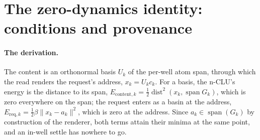 \documentclass{article} %
\begin{document}
\section{The zero-dynamics identity: conditions and provenance}
\label{app:clue}

\paragraph{The derivation.} The content is an orthonormal basis $U_k$ of the per-well atom span,
through which the read renders the request's address, $x_k=U_k c_k$. For a basis, the n-CLU's
energy is the distance to its span,
$E_{\text{content},k}=\tfrac12\operatorname{dist}^2(x_k,\operatorname{span}G_k)$, which is zero
everywhere on the span; the request enters as a basin at the address, $E_{\text{req},k}=\tfrac12\beta\lVert
x_k-a_k\rVert^2$, which is zero at the address. Since $a_k\in\operatorname{span}(G_k)$ by
construction of the renderer, both terms attain their minima at the same point, and an in-well
settle has nowhere to go.
\end{document}
